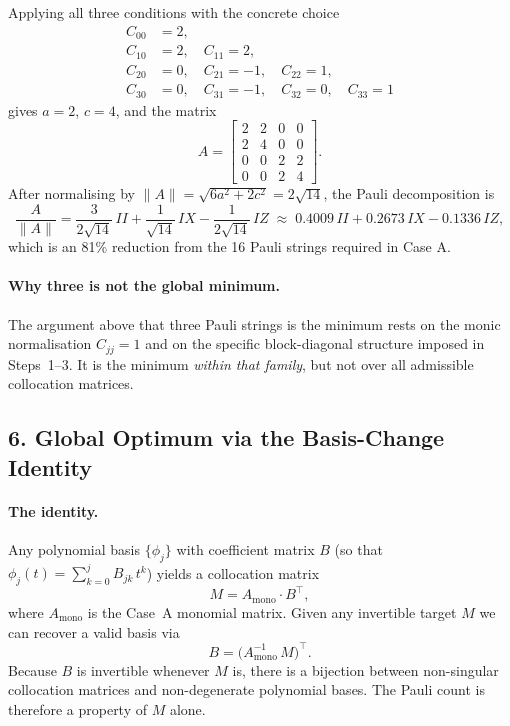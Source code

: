 \documentclass{article}
\begin{document}
Applying all three conditions with the concrete choice
\begin{align*}
    C_{00} &= 2, \\
    C_{10} &= 2, \quad C_{11} = 2, \\
    C_{20} &= 0, \quad C_{21} = -1, \quad C_{22} = 1, \\
    C_{30} &= 0, \quad C_{31} = -1, \quad C_{32} = 0, \quad C_{33} = 1
\end{align*}
gives $a = 2$, $c = 4$, and the matrix
\begin{equation}
A =
\begin{bmatrix}
2 & 2 & 0 & 0 \\
2 & 4 & 0 & 0 \\
0 & 0 & 2 & 2 \\
0 & 0 & 2 & 4
\end{bmatrix}.
\end{equation}
After normalising by $\|A\| = \sqrt{6a^2+2c^2} = 2\sqrt{14}$, the Pauli decomposition is
\begin{equation}
    \frac{A}{\|A\|} = \frac{3}{2\sqrt{14}}\,II + \frac{1}{\sqrt{14}}\,IX - \frac{1}{2\sqrt{14}}\,IZ
    \;\approx\; 0.4009\,II + 0.2673\,IX - 0.1336\,IZ,
\end{equation}
which is an 81\% reduction from the 16 Pauli strings required in Case A.

\paragraph{Why three is not the global minimum.}
The argument above that three Pauli strings is the minimum rests on the monic
normalisation $C_{jj}=1$ and on the specific block-diagonal structure imposed in
Steps~1--3.  It is the minimum \emph{within that family}, but not over all
admissible collocation matrices.

\subsection*{6. Global Optimum via the Basis-Change Identity}

\paragraph{The identity.}
Any polynomial basis $\{\phi_j\}$ with coefficient matrix $B$
(so that $\phi_j(t)=\sum_{k=0}^{j}B_{jk}\,t^k$) yields a collocation matrix
\begin{equation}
    M = A_{\mathrm{mono}} \cdot B^{\top},
\end{equation}
where $A_{\mathrm{mono}}$ is the Case~A monomial matrix.  Given any invertible
target $M$ we can recover a valid basis via
\begin{equation}
    B = \bigl(A_{\mathrm{mono}}^{-1}\,M\bigr)^{\!\top}.
\end{equation}
Because $B$ is invertible whenever $M$ is, there is a bijection between
non-singular collocation matrices and non-degenerate polynomial bases.
The Pauli count is therefore a property of $M$ alone.
\end{document}
